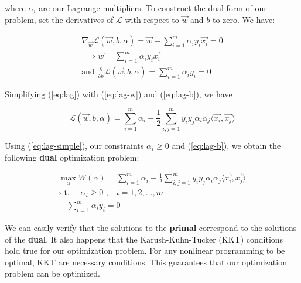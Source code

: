 where $\alpha_i$ are our Lagrange multipliers. To construct the dual form of our problem, set the derivatives of $\mathcal{L}$ with respect to $\vec{w}$ and $b$ to zero. We have:

\begin{gather}
\nabla_{\vec{w}}\mathcal{L}(\vec{w}, b, \alpha) = \vec{w} - \sum_{i = 1}^{m}\alpha_{i}y_{i}\vec{x_i} = 0 \nonumber \\
\implies \vec{w} = \sum_{i = 1}^{m}\alpha_{i}y_{i}\vec{x_i} \label{eq:lag-w}\\
\text{and } \frac{\partial}{\partial b}\mathcal{L}(\vec{w}, b, \alpha) = \sum_{i = 1}^{m}\alpha_{i}y_{i} = 0 \label{eq:lag-b}
\end{gather}

Simplifying (\ref{eq:lag}) with (\ref{eq:lag-w}) and (\ref{eq:lag-b}), we have

\begin{equation}
\mathcal{L}(\vec{w}, b, \alpha) = \sum_{i = 1}^{m}\alpha_{i} - \frac{1}{2}\sum_{i,j = 1}^{m}y_{i}y_{j}\alpha_{i}\alpha_{j}\langle\vec{x_i}, \vec{x_j}\rangle \label{eq:lag-simple}
\end{equation}

Using (\ref{eq:lag-simple}), our constraints $\alpha_{i} \geq 0$ and (\ref{eq:lag-b}), we obtain the following \textbf{dual} optimization problem:

\begin{gather}
\max_{\alpha} W(\alpha) = \sum_{i = 1}^{m}\alpha_{i} - \frac{1}{2}\sum_{i,j = 1}^{m}y_{i}y_{j}\alpha_{i}\alpha_{j}\langle\vec{x_i}, \vec{x_j}\rangle \label{eq:dual} \\
\text{s.t. } \quad\alpha_{i} \geq 0\text{ ,}\quad\text{$i = 1, 2, \dots , m$} \label{eq:dual-c1} \\
\quad \sum_{i = 1}^{m}\alpha_{i}y_{i} = 0 \label{eq:dual-c2}
\end{gather}

We can easily verify that the solutions to the \textbf{primal} correspond to the solutions of the \textbf{dual}. It also happens that the Karush-Kuhn-Tucker (KKT) conditions hold true for our optimization problem. For any nonlinear programming to be optimal, KKT are necessary conditions. This guarantees that our optimization problem can be optimized.


